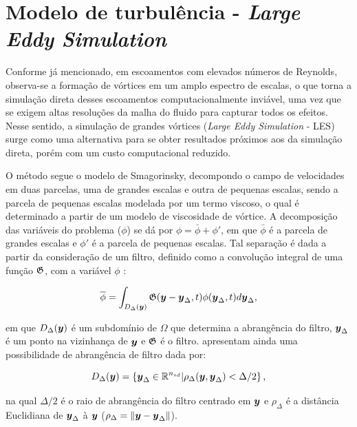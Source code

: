 \section{Modelo de turbulência - \textit{Large Eddy Simulation}} \label{LES}

Conforme já mencionado, em escoamentos com elevados números de Reynolds, observa-se a formação de vórtices em um amplo espectro de escalas, o que torna a simulação direta desses escoamentos computacionalmente inviável, uma vez que se exigem altas resoluções da malha do fluido para capturar todos os efeitos. Nesse sentido, a simulação de grandes vórtices (\textit{Large Eddy Simulation} - LES) surge como uma alternativa para se obter resultados próximos aos da simulação direta, porém com um custo computacional reduzido.

O método segue o modelo de Smagorinsky, decompondo o campo de velocidades em duas parcelas, uma de grandes escalas e outra de pequenas escalas, sendo a parcela de pequenas escalas modelada por um termo viscoso, o qual é determinado a partir de um modelo de viscosidade de vórtice. A decomposição das variáveis do problema ($\phi$) se dá por $\phi=\bar{\phi}+\phi'$, em que $\bar{\phi}$ é a parcela de grandes escalas e $\phi'$ é a parcela de pequenas escalas. Tal separação é dada a partir da consideração de um filtro, definido como a convolução integral de uma função $\mathfrak{G}$, com a variável $\phi$ \cite{germano1991dynamic,hughes2000large,moeng2015large,katopodes2019free}:

\begin{equation}
    \overline{\phi}=\int_{D_\Delta(\boldsymbol{y})}{\mathfrak{G}(\boldsymbol{y}-\boldsymbol{y}_\Delta,t)\phi(\boldsymbol{y}_\Delta,t)d\boldsymbol{y}_\Delta}\text{,}
\end{equation}

\noindent em que $D_\Delta(\boldsymbol{y})$ é um subdomínio de $\Omega$ que determina a abrangência do filtro, $\boldsymbol{y}_\Delta$ é um ponto na vizinhança de $\boldsymbol{y}$ e $\mathfrak{G}$ é o filtro.  apresentam ainda uma possibilidade de abrangência de filtro dada por:

\begin{equation}
    D_\Delta(\boldsymbol{y})=\left\{\boldsymbol{y}_\Delta\in\mathbb{R}^{n_{sd}}|\rho_\Delta(\boldsymbol{y},\boldsymbol{y}_\Delta)<\Delta/2\right\}\text{,}
\end{equation}

\noindent na qual $\Delta/2$ é o raio de abrangência do filtro centrado em $\boldsymbol{y}$ e $\rho_\Delta$ é a distância Euclidiana de $\boldsymbol{y}_\Delta$ à $\boldsymbol{y}$ ($\rho_\Delta=\left\lVert{\boldsymbol{y}-\boldsymbol{y}_\Delta}\right\lVert$).

